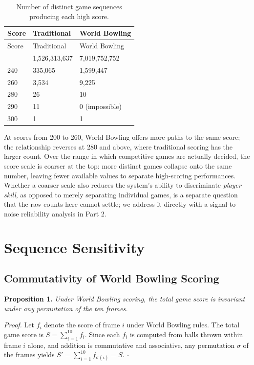 \documentclass[
  letterpaper,
  DIV=11,
  numbers=noendperiod]{scrartcl}
\begin{document}
\begin{longtable}[]{@{}lll@{}}
\caption{Number of distinct game sequences producing each high
score.}\label{tbl-compression}\tabularnewline
\toprule\noalign{}
Score & Traditional & World Bowling \\
\midrule\noalign{}
\endfirsthead
\toprule\noalign{}
Score & Traditional & World Bowling \\
\midrule\noalign{}
\endhead
\bottomrule\noalign{}
\endlastfoot
200 & 1,526,313,637 & 7,019,752,752 \\
240 & 335,065 & 1,599,447 \\
260 & 3,534 & 9,225 \\
280 & 26 & 10 \\
290 & 11 & 0 (impossible) \\
300 & 1 & 1 \\
\end{longtable}

At scores from 200 to 260, World Bowling offers more paths to the same
score; the relationship reverses at 280 and above, where traditional
scoring has the larger count. Over the range in which competitive games
are actually decided, the score scale is coarser at the top: more
distinct games collapse onto the same number, leaving fewer available
values to separate high-scoring performances. Whether a coarser scale
also reduces the system's ability to discriminate \emph{player skill},
as opposed to merely separating individual games, is a separate question
that the raw counts here cannot settle; we address it directly with a
signal-to-noise reliability analysis in Part 2.

\section{Sequence Sensitivity}\label{sequence-sensitivity}

\subsection{Commutativity of World Bowling
Scoring}\label{commutativity-of-world-bowling-scoring}

\textbf{Proposition 1.} \emph{Under World Bowling scoring, the total
game score is invariant under any permutation of the ten frames.}

\emph{Proof.} Let \(f_i\) denote the score of frame \(i\) under World
Bowling rules. The total game score is \(S = \sum_{i=1}^{10} f_i\).
Since each \(f_i\) is computed from balls thrown within frame \(i\)
alone, and addition is commutative and associative, any permutation
\(\sigma\) of the frames yields
\(S' = \sum_{i=1}^{10} f_{\sigma(i)} = S\). \(\square\)
\end{document}
